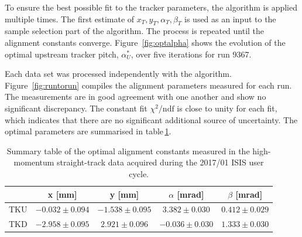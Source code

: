 To ensure the best possible fit to the tracker parameters, the algorithm is applied multiple times. The first estimate of $x_T,y_T,\alpha_T,\beta_T$ is used as an input to the sample selection part of the algorithm. The process is repeated until the alignment constants converge. Figure~\ref{fig:optalpha} shows the evolution of the optimal upstream tracker pitch, $\alpha_U^
*$, over five iterations for run 9367.

Each data set was processed independently with the algorithm. Figure~\ref{fig:runtorun} compiles the alignment parameters measured for each run. The measurements are in good agreement with one another and show no significant discrepancy. The constant fit $\chi^2/\text{ndf}$ is close to unity for each fit, which indicates that there are no significant additional source of uncertainty. The optimal parameters are summarised in table\,\ref{tab:201701_constants}.

\begin{table}[h!]
	\centering
		\begin{tabular}{l|c|c|c|c}
			& x [mm] & y [mm] & $\alpha$ [mrad] & $\beta$ [mrad] \\
			\hline
			TKU & $-0.032\pm0.094$ & $-1.538\pm0.095$ & $3.382\pm0.030$ & $0.412\pm0.029$ \\
			TKD & $-2.958\pm0.095$ & $2.921\pm0.096$ & $-0.036\pm0.030$ & $1.333\pm0.030$
		\end{tabular}
	\caption{Summary table of the optimal alignment constants measured in the high-momentum straight-track data acquired during the 2017/01 ISIS user cycle.}
	\label{tab:201701_constants}
\end{table}

